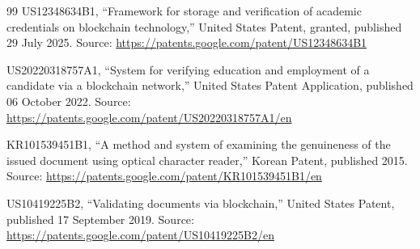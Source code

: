 \documentclass[12pt,a4paper]{article}
\begin{document}
\begin{thebibliography}{99}
US12348634B1,
\newblock ``Framework for storage and verification of academic credentials on blockchain technology,''
\newblock United States Patent, granted, published 29 July 2025.
\newblock Source: \url{https://patents.google.com/patent/US12348634B1}

US20220318757A1,
\newblock ``System for verifying education and employment of a candidate via a blockchain network,''
\newblock United States Patent Application, published 06 October 2022.
\newblock Source: \url{https://patents.google.com/patent/US20220318757A1/en}

KR101539451B1,
\newblock ``A method and system of examining the genuineness of the issued document using optical character reader,''
\newblock Korean Patent, published 2015.
\newblock Source: \url{https://patents.google.com/patent/KR101539451B1/en}

US10419225B2,
\newblock ``Validating documents via blockchain,''
\newblock United States Patent, published 17 September 2019.
\newblock Source: \url{https://patents.google.com/patent/US10419225B2/en}

\end{thebibliography}
\end{document}
